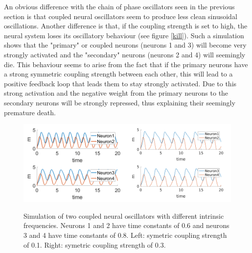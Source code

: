 \documentclass[a4paper]{scrartcl}
\begin{document}
An obvious difference with the chain of phase oscillators seen in the previous section is that coupled neural oscillators  seem to produce less clean sinusoidal oscillations. Another difference is that, if the coupling strength is set to high, the neural system loses its oscillatory behaviour (see figure \ref{kill}). Such a simulation shows that the "primary" or coupled neurons (neurons 1 and 3) will become very strongly activated and the "secondary" neurons (neurons 2 and 4) will seemingly die. This behaviour seems to arise from the fact that if the primary neurons have a strong symmetric coupling strength between each other, this will lead to a positive feedback loop that leads them to stay strongly activated. Due to this strong activation and the negative weight from the primary neurons to the secondary neurons will be strongly repressed, thus explaining their seemingly premature death. 



\begin{figure}[!b]
	\centering
	\includegraphics[width=0.5\textwidth]{fig/neuron1.png}\includegraphics[width=0.5\textwidth]{fig/figure7a_coupledneurons.png}
	\caption{Simulation of two coupled neural oscillators with different intrinsic frequencies. Neurons 1 and 2 have time constants of 0.6 and neurons 3 and 4 have time constants of 0.8. Left: symetric coupling strength of 0.1. Right: symetric coupling strength of 0.3.}\label{2phase}
\end{figure}
\end{document}
